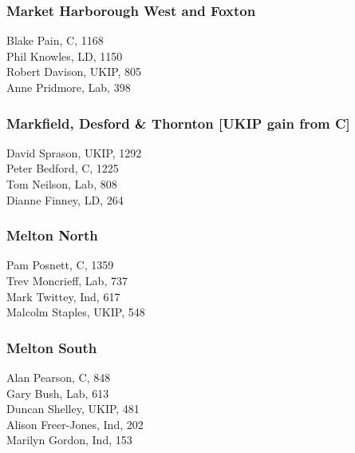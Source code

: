 \documentclass[a4paper,openany,10pt]{book}
\begin{document}
\subsubsection*{Market Harborough West and Foxton}



Blake Pain, C, 1168\\
Phil Knowles, LD, 1150\\
Robert Davison, UKIP, 805\\
Anne Pridmore, Lab, 398\\


\subsubsection*{Markfield, Desford \& Thornton \hspace*{\fill}\nolinebreak[1]%
\enspace\hspace*{\fill}
[UKIP gain from C]}



David Sprason, UKIP, 1292\\
Peter Bedford, C, 1225\\
Tom Neilson, Lab, 808\\
Dianne Finney, LD, 264\\


\subsubsection*{Melton North}



Pam Posnett, C, 1359\\
Trev Moncrieff, Lab, 737\\
Mark Twittey, Ind, 617\\
Malcolm Staples, UKIP, 548\\


\subsubsection*{Melton South}



Alan Pearson, C, 848\\
Gary Bush, Lab, 613\\
Duncan Shelley, UKIP, 481\\
Alison Freer-Jones, Ind, 202\\
Marilyn Gordon, Ind, 153\\
\end{document}
